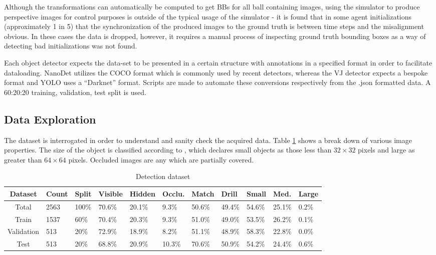 \documentclass[a4paper,twoside,12pt]{report}
\begin{document}
Although the transformations can automatically be computed to get BBs for all ball containing images, using the simulator to produce perspective images for control purposes is outside of the typical usage of the simulator - it is found that in some agent initializations (approximately 1 in 5) that the synchronization of the produced images to the ground truth is between time steps and the misalignment obvious. In these cases the data is dropped, however, it requires a manual process of inspecting ground truth bounding boxes as a way of detecting bad initializations was not found.

Each object detector expects the data-set to be presented in a certain structure with annotations in a specified format in order to facilitate dataloading. NanoDet utilizes the COCO format \citep{cocodataset} which is commonly used by recent detectors, whereas the VJ detector expects a bespoke format \citep{vjdataset} and YOLO uses a ``Darknet'' format. Scripts are made to automate these conversions respectively from the .json formatted data. A 60:20:20 training, validation, test split is used.

\subsection{Data Exploration}
The dataset is interrogated in order to understand and sanity check the acquired data. Table \ref{tab:detection} shows a break down of various image properties. The size of the object is classified according to \cite{cocoeval}, which declares small objects as those less than $32\times32$ pixels and large as greater than $64\times64$ pixels. Occluded images are any which are partially covered.

\begin{table}[h!]
\fontsize{9.5pt}{12pt}\selectfont
\centering
\begin{tabular}{c|ll|lll|ll|lll}
{\bf Dataset}	&{\bf Count}	&{\bf Split}	&{\bf Visible}	&{\bf Hidden}	&{\bf Occlu.}	&{\bf Match}	&{\bf Drill}	&{\bf Small}	&{\bf Med.}	&{\bf Large}	\\\hline
Total			&2563			&100\%			&70.6\%			&20.1\%			&9.3\%			&50.6\%			&49.4\%			&54.6\%			&25.1\%			&0.2\%			\\\hline   
Train			&1537			&60\%			&70.4\%			&20.3\%			&9.3\%			&51.0\%			&49.0\%			&53.5\%			&26.2\%			&0.1\%			\\\hline  
Validation		&513			&20\%			&72.9\%			&18.9\%			&8.2\%			&51.1\%			&48.9\%			&58.3\%			&22.8\%			&0.0\%			\\\hline  
Test			&513			&20\%			&68.8\%			&20.9\%			&10.3\%			&70.6\%			&50.9\%			&54.2\%			&24.4\%			&0.6\%			\\\hline                        
\end{tabular}
\caption{Detection dataset}
\label{tab:detection}
\end{table}
\end{document}
